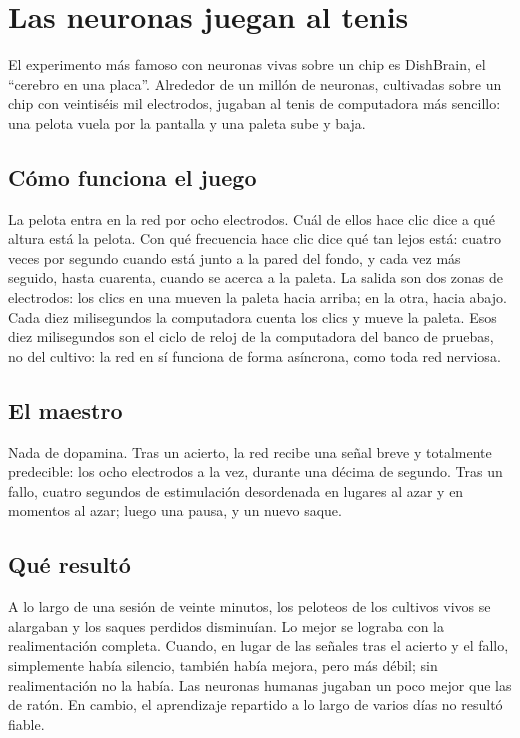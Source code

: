 \chapter{Las neuronas juegan al tenis}

El experimento más famoso con neuronas vivas sobre un chip es DishBrain, el “cerebro en una placa”. Alrededor de un millón de neuronas, cultivadas sobre un chip con veintiséis mil electrodos, jugaban al tenis de computadora más sencillo: una pelota vuela por la pantalla y una paleta sube y baja.

\section*{Cómo funciona el juego}

La pelota entra en la red por ocho electrodos. Cuál de ellos hace clic dice a qué altura está la pelota. Con qué frecuencia hace clic dice qué tan lejos está: cuatro veces por segundo cuando está junto a la pared del fondo, y cada vez más seguido, hasta cuarenta, cuando se acerca a la paleta. La salida son dos zonas de electrodos: los clics en una mueven la paleta hacia arriba; en la otra, hacia abajo. Cada diez milisegundos la computadora cuenta los clics y mueve la paleta. Esos diez milisegundos son el ciclo de reloj de la computadora del banco de pruebas, no del cultivo: la red en sí funciona de forma asíncrona, como toda red nerviosa.


\section*{El maestro}

Nada de dopamina. Tras un acierto, la red recibe una señal breve y totalmente predecible: los ocho electrodos a la vez, durante una décima de segundo. Tras un fallo, cuatro segundos de estimulación desordenada en lugares al azar y en momentos al azar; luego una pausa, y un nuevo saque.

\section*{Qué resultó}

A lo largo de una sesión de veinte minutos, los peloteos de los cultivos vivos se alargaban y los saques perdidos disminuían. Lo mejor se lograba con la realimentación completa. Cuando, en lugar de las señales tras el acierto y el fallo, simplemente había silencio, también había mejora, pero más débil; sin realimentación no la había. Las neuronas humanas jugaban un poco mejor que las de ratón. En cambio, el aprendizaje repartido a lo largo de varios días no resultó fiable.

